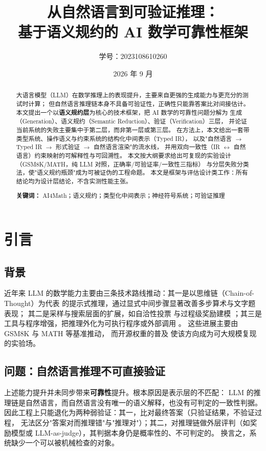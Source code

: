 \documentclass[11pt]{article}
\title{从自然语言到可验证推理：\\基于语义规约的 AI 数学可靠性框架}
\author{学号：2023108610260}
\date{2026 年 9 月}
\begin{document}
\maketitle

\begin{abstract}
大语言模型（LLM）在数学推理上的表现提升，主要来自更强的生成能力与更充分的测试时计算；
但自然语言推理链本身不具备可验证性，正确性只能靠答案比对间接估计。
本文提出一个以\textbf{语义规约层}为核心的技术框架，把 AI 数学的可靠性问题分解为
生成（Generation）、语义规约（Semantic Reduction）、验证（Verification）三层，
并论证当前系统的失败主要集中于第二层，而非第一层或第三层。
在方法上，本文给出一套带类型系统、操作语义与约束系统的结构化中间表示（Typed IR），
以及"自然语言 $\to$ Typed IR $\to$ 形式验证 $\to$ 自然语言渲染"的流水线，
并用双向一致性（IR $\leftrightarrow$ 自然语言）约束映射的可解释性与可回溯性。
本文按大纲要求给出可复现的实验设计（GSM8K/MATH，纯 LLM 对照，正确率/可验证率/一致性三指标）
与分层失败分类法，使"语义规约瓶颈"成为可被证伪的工程命题。
本文是框架与评估设计类工作：所有结论均为设计层结论，不含实测性能主张。

\textbf{关键词：} AI4Math；语义规约；类型化中间表示；神经符号系统；可验证推理
\end{abstract}

\section{引言}

\subsection{背景}
近年来 LLM 的数学能力主要由三条技术路线推动：其一是以思维链（Chain-of-Thought）为代表
的提示式推理，通过显式中间步骤显著改善多步算术与文字题表现\cite{wei2022cot}；
其二是采样与搜索层面的扩展，如自洽性投票\cite{wang2022selfconsistency} 与过程级奖励建模
\cite{lightman2023verify}；其三是工具与程序增强，把推理外化为可执行程序或外部调用
\cite{chen2022programofthoughts,gao2022pal,schick2023toolformer}。
这些进展主要由 GSM8K\cite{cobbe2021gsm8k} 与 MATH\cite{hendrycks2021math} 等基准推动，
而开源权重的普及\cite{touvron2023llama} 使该方向成为可大规模复现的实验场。

\subsection{问题：自然语言推理不可直接验证}
上述能力提升并未同步带来\textbf{可靠性}提升。根本原因是表示层的不匹配：
LLM 的推理链是自然语言，而自然语言没有唯一的语义解释，也没有可判定的一致性判据。
因此工程上只能退化为两种弱验证：其一，比对最终答案（只验证结果，不验证过程，
无法区分"答案对而推理错"与"推理对"）；其二，对推理链做外层评判（如奖励模型或
LLM-as-judge），其判据本身仍是概率性的、不可判定的。
换言之，系统缺少一个可以被机械检查的对象。
\end{document}
